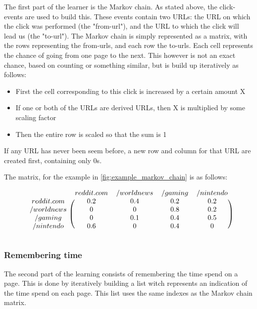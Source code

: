 \documentclass{article}
\begin{document}
The first part of the learner is the Markov chain.
As stated above, the click-events are used to build this.
These events contain two URLs: the URL on which the click was performed (the "from-url"), and the URL to which the click will lead us (the "to-url").
The Markov chain is simply represented as a matrix, with the rows representing the from-urls, and each row the to-urls.
Each cell represents the chance of going from one page to the next.
This however is not an exact chance, based on counting or something similar, but is build up iteratively as follows:

\begin{itemize}
    \item First the cell corresponding to this click is increased by a certain amount X
    \item If one or both of the URLs are derived URLs, then X is multiplied by some scaling factor
    \item Then the entire row is scaled so that the sum is 1
\end{itemize}

If any URL has never been seem before, a new row and column for that URL are created first, containing only 0s.

The matrix, for the example in \autoref{fig:example_markov_chain} is as follows:

\[
\begin{blockarray}{ccccc}
& reddit.com & /worldnews & /gaming & /nintendo \\
\begin{block}{c(cccc)}
    reddit.com      & 0.2           & 0.4           & 0.2       & 0.2 \\
    /worldnews      & 0             & 0             & 0.8       & 0.2 \\
    /gaming         & 0             & 0.1           & 0.4       & 0.5 \\
    /nintendo       & 0.6           & 0             & 0.4       & 0   \\
\end{block}
\end{blockarray}
\]

\subsubsection{Remembering time}

The second part of the learning consists of remembering the time spend on a page.
This is done by iteratively building a list witch represents an indication of the time spend on each page.
This list uses the same indexes as the Markov chain matrix.
\end{document}

